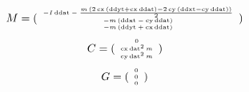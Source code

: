 \documentclass[fleqn, a4paper, 12pt, russian]{article}
\begin{document}
\begin{landscape}
\begin{equation}
{		}\end{equation}
		\begin{equation}
		\tiny{
			M=
			(\begin{array}{c} -I\,\mathrm{ddat}-\frac{m\,(2\,\mathrm{cx}\,(\mathrm{ddyt}+\mathrm{cx}\,\mathrm{ddat})-2\,\mathrm{cy}\,(\mathrm{ddxt}-\mathrm{cy}\,\mathrm{ddat}))}{2}\\ -m\,(\mathrm{ddxt}-\mathrm{cy}\,\mathrm{ddat})\\ -m\,(\mathrm{ddyt}+\mathrm{cx}\,\mathrm{ddat}) \end{array})
		}\end{equation}
		\begin{equation}
		\tiny{
			C=
			(\begin{array}{c} 0\\ \mathrm{cx}\,{\mathrm{dat}}^2\,m\\ \mathrm{cy}\,{\mathrm{dat}}^2\,m \end{array})
		}\end{equation}
		\begin{equation}
		\tiny{
			G=
			(\begin{array}{c} 0\\ 0\\ 0 \end{array})
		}\end{equation}
		
	\end{landscape}
\end{document}
